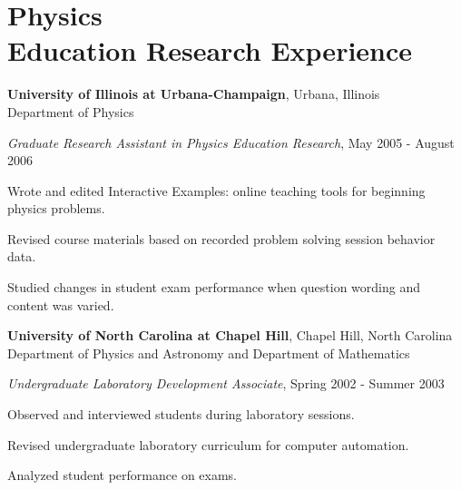 \section{\sc Physics\\Education Research Experience} %
{\bf University of Illinois at Urbana-Champaign}, Urbana, Illinois\\
Department of Physics
\begin{list1}
\vspace{1mm}
\item[] {\em Graduate Research Assistant in Physics Education Research}, May 2005 - August 2006
\begin{list2}
\item[-] Wrote and edited Interactive Examples: online teaching tools for beginning physics problems.  
\item[-] Revised course materials based on recorded problem solving session behavior data.
\item[-] Studied changes in student exam performance when question wording and content was varied.
\end{list2}
\end{list1}

{\bf University of North Carolina at Chapel Hill}, Chapel Hill, North Carolina\\
Department of Physics and Astronomy and Department of Mathematics
\begin{list1}
\vspace{1mm}
\item[] {\em Undergraduate Laboratory Development Associate}, Spring 2002 - Summer 2003
\begin{list2}
\item[-] Observed and interviewed students during laboratory sessions.
\item[-] Revised undergraduate laboratory curriculum for computer automation.  
\item[-] Analyzed student performance on exams.
\end{list2}
\end{list1}

